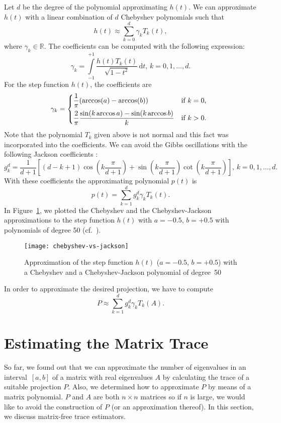 \documentclass[%
	paper=a4,
	fontsize=10pt,
	DIV11,BCOR10mm,
	numbers=noenddot,
	abstract=yes
]{scrartcl}
\newcommand{\R}{\mathbb{R}}
\theoremstyle{definition}
\begin{document}
Let $d$ be the degree of the polynomial approximating $h(t)$. We can approximate
$h(t)$ with a linear combination of $d$ Chebyshev polynomials such that
\[ h(t) \approx \sum_{k=0}^d \gamma_k T_k(t), \]
where $\gamma_k \in \R$. The coefficients can be computed with the following
expression:
\[
	\gamma_k =
	\int\limits_{-1}^{+1} \frac{h(t) T_k(t)}{\sqrt{1 - t^2}}\,\mathrm{d}t,
	\, k = 0, 1, \dotsc, d.
\]
For the step function $h(t)$, the coefficients are \cite{DiNapoli2016}
\[
	\gamma_k =
	\begin{dcases*}
		\frac{1}{\pi} (\arccos(a) - \arccos(b)) & if $k = 0$, \\
		\frac{2}{\pi} \frac{\sin(k \arccos a) - \sin(k \arccos b)}{k} &
			if $k > 0$.
	\end{dcases*}
\]
Note that the polynomial $T_k$ given above is not normal and this fact was
incorporated into the coefficients. We can avoid the Gibbs oscillations with the
following Jackson coefficients \cite[§II.C.3]{Weisse2006}:
\[
	g_k^d =
	\frac{1}{d+1}
	\left[
		(d - k + 1) \cos\left(k \frac{\pi}{d+1}\right) +
		\sin\left(k \frac{\pi}{d+1}\right) \cot\left(k \frac{\pi}{d+1}\right)
	\right], \, k = 0, 1, \dotsc, d.
\]
With these coefficients the approximating polynomial $p(t)$ is
\[ p(t) = \sum_{k=1}^d g_k^d \gamma_k T_k(t). \]
In Figure~\ref{fig:chebyshev-vs-jackson}, we plotted the Chebyshev and the
Chebyshev-Jackson approximations to the step function $h(t)$ with $a = -0.5$, $b
= +0.5$ with polynomials of degree 50 (cf.~\cite[Fig.~1]{DiNapoli2016}).

\begin{figure}
	\begin{center}
		\texttt{[image: chebyshev-vs-jackson]}
	\end{center}
	\caption{Approximation of the step function $h(t)$ ($a = -0.5$, $b =
		+0.5$) with a Chebyshev and a Chebyshev-Jackson polynomial of
	degree~50}
	\label{fig:chebyshev-vs-jackson}
\end{figure}

In order to approximate the desired projection, we have to compute
\[ P \approx \sum_{k=1}^d g_k^d \gamma_k T_k(A). \]



\section{Estimating the Matrix Trace}

So far, we found out that we can approximate the number of eigenvalues in an
interval~$[a, b]$ of a matrix with real eigenvalues $A$ by calculating the trace
of a suitable projection $P$. Also, we determined how to approximate $P$ by
means of a matrix polynomial. $P$ and $A$ are both $n \times n$ matrices so if
$n$ is large, we would like to avoid the construction of $P$ (or an
approximation thereof). In this section, we discuss matrix-free trace
estimators.
\end{document}
